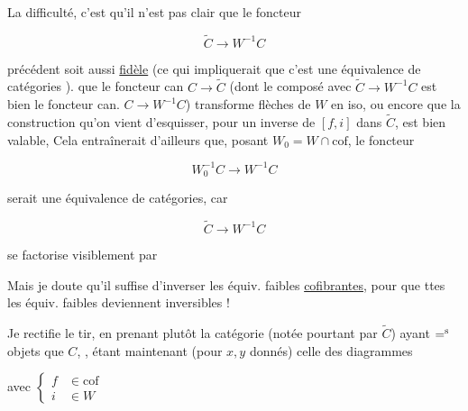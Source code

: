 
La difficulté, c'est qu'il n'est pas clair que le foncteur

\[
 \widetilde C\longrightarrow W^{-1}C
\]

précédent soit aussi \uline{fidèle} (ce qui impliquerait que c'est une équivalence de catégories ).   que le foncteur can $C\longrightarrow\widetilde C$ (dont le composé avec $\widetilde C\longrightarrow W^{-1}C$ est bien le foncteur can. $C\longrightarrow W^{-1}C$) transforme flèches de $W$ en iso, ou encore que la construction qu'on vient  d'esquisser, pour   un inverse de $[f,i]$ dans $\widetilde C$, est bien valable,  Cela entraînerait d'ailleurs  que,  posant $W_0=W\cap\mathrm{cof}$, le foncteur

\[
 W_0^{-1}C\longrightarrow W^{-1}C
\]

serait une équivalence de catégories, car

\[
 \widetilde C\longrightarrow W^{-1}C
\]

se factorise visiblement par


Mais je doute qu'il suffise d'inverser les équiv. faibles \uline{cofibrantes}, pour que ttes les équiv. faibles deviennent inversibles !

Je rectifie  le tir, en prenant plutôt la catégorie (notée pourtant par $\widetilde C$) ayant $\mathord{=}^{\rm s}$ objets que $C$,  ,   étant maintenant (pour $x,y$ donnés)  celle des diagrammes 


avec $\left\{\begin{aligned} f&\in\mathrm{cof}\\ i&\in W\end{aligned}\right.$
